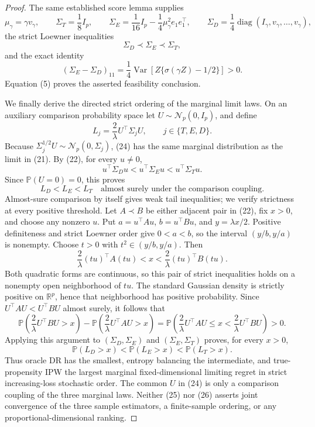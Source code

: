 \documentclass{article}
\begin{document}
\begin{proof}
The same established score lemma supplies
\[
 \mu_\gamma=\gamma v_\gamma,
 \qquad
 \Sigma_T=\frac18I_p,
 \qquad
 \Sigma_E=\frac1{16}I_p-\frac14\mu_\gamma^2e_1e_1^\top,
 \qquad
 \Sigma_D=\frac14\operatorname{diag}
 (I_\gamma,v_\gamma,\ldots,v_\gamma),
\]
the strict Loewner inequalities
\[
 \Sigma_D\prec\Sigma_E\prec\Sigma_T,
 \tag{22}
\]
and the exact identity
\[
 (\Sigma_E-\Sigma_D)_{11}
 =\frac14\operatorname{Var}
 \!\left[Z\{\sigma(\gamma Z)-1/2\}\right]>0.
 \tag{23}
\]
Equation (5) proves the asserted feasibility conclusion.

We finally derive the directed strict ordering of the marginal limit laws.
On an auxiliary comparison probability space let
\(U\sim\mathcal N_p(0,I_p)\), and define
\[
 L_j=\frac2\lambda U^\top\Sigma_jU,
 \qquad j\in\{T,E,D\}.
 \tag{24}
\]
Because \(\Sigma_j^{1/2}U\sim\mathcal N_p(0,\Sigma_j)\), (24) has the same
marginal distribution as the limit in (21).  By (22), for every
\(u\ne0\),
\[
 u^\top\Sigma_Du<u^\top\Sigma_Eu<u^\top\Sigma_Tu.
\]
Since \(\mathbb P(U=0)=0\), this proves
\[
 L_D<L_E<L_T\quad\text{almost surely under the comparison coupling}.
 \tag{25}
\]
Almost-sure comparison by itself gives weak tail inequalities; we verify
strictness at every positive threshold.  Let \(A\prec B\) be either adjacent
pair in (22), fix \(x>0\), and choose any nonzero \(u\).  Put
\(a=u^\top Au\), \(b=u^\top Bu\), and \(y=\lambda x/2\).  Positive
definiteness and strict Loewner order give \(0<a<b\), so the interval
\((y/b,y/a)\) is nonempty.  Choose \(t>0\) with
\(t^2\in(y/b,y/a)\).  Then
\[
 \frac2\lambda (tu)^\top A(tu)<x<
 \frac2\lambda (tu)^\top B(tu).
\]
Both quadratic forms are continuous, so this pair of strict inequalities
holds on a nonempty open neighborhood of \(tu\).  The standard Gaussian
density is strictly positive on \(\mathbb R^p\), hence that neighborhood has
positive probability.  Since
\(U^\top AU<U^\top BU\) almost surely, it follows that
\[
 \mathbb P\!\left(\frac2\lambda U^\top BU>x\right)
 -\mathbb P\!\left(\frac2\lambda U^\top AU>x\right)
 =\mathbb P\!\left(
   \frac2\lambda U^\top AU\le x<\frac2\lambda U^\top BU
  \right)>0.
\]
Applying this argument to \((\Sigma_D,\Sigma_E)\) and
\((\Sigma_E,\Sigma_T)\) proves, for every \(x>0\),
\[
 \mathbb P(L_D>x)<\mathbb P(L_E>x)<\mathbb P(L_T>x).
 \tag{26}
\]
Thus oracle DR has the smallest, entropy balancing the intermediate, and
true-propensity IPW the largest marginal fixed-dimensional limiting regret in
strict increasing-loss stochastic order.  The common \(U\) in (24) is only a
comparison coupling of the three marginal laws.  Neither (25) nor (26)
asserts joint convergence of the three sample estimators, a finite-sample
ordering, or any proportional-dimensional ranking.
\end{proof}
\end{document}
